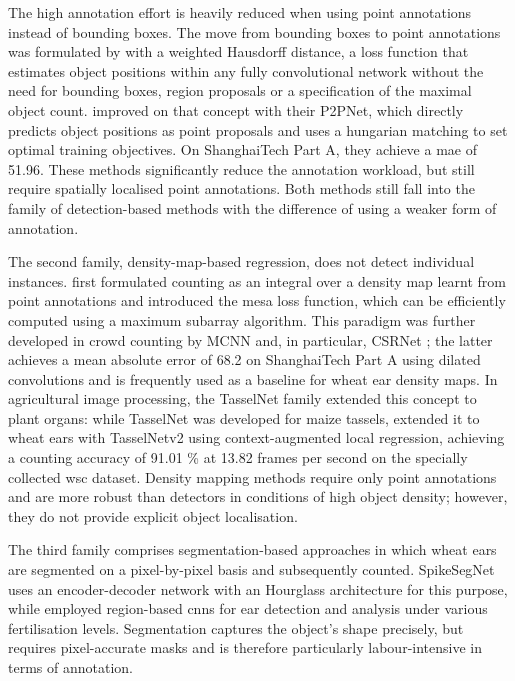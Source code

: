 \documentclass[12pt,parskip = half, DIV=classic,listof=totoc]{scrartcl}
\begin{document}
			The high annotation effort is heavily reduced when using point annotations instead of bounding boxes. The move from bounding boxes to point annotations was formulated by 
			\cite{riberaLocatingObjectsBounding2019} with a weighted Hausdorff distance, a loss function that
			estimates object positions within any fully convolutional network without the need for bounding boxes, region proposals or a specification of the maximal object count.
			\textcite{songRethinkingCountingLocalization2021} improved on that concept with their P2PNet, which directly predicts object positions as point proposals and uses a hungarian matching 
			to set optimal training objectives. On ShanghaiTech Part A, they achieve a \ac{mae} of 51.96. These methods significantly reduce the annotation workload, 
			but still require spatially localised point annotations. Both methods still fall into the family of detection-based methods with the
			difference of using a weaker form of annotation.

			The second family, density-map-based regression, does not detect individual instances. \textcite{lempitskyLearningCountObjects2010} first formulated counting as an integral over a density 
			map learnt from point annotations and introduced the \ac{mesa} loss function, which can be efficiently computed using a maximum subarray algorithm. This paradigm was further developed 
			in crowd counting by MCNN \cite{zhangSingleImageCrowdCounting2016} and, in particular, CSRNet \cite{liCSRNetDilatedConvolutional2018}; the latter achieves a mean absolute error of 68.2 on ShanghaiTech Part A using dilated 
			convolutions and is frequently used as a baseline for wheat ear density maps. In agricultural image processing, the TasselNet family extended this concept to plant organs: 
			while TasselNet \cite{luTasselNetCountingMaize2017} was developed for maize tassels, \textcite{xiongTasselNetv2InfieldCounting2019} extended it to wheat ears with TasselNetv2 using context-augmented local regression, 
			achieving a counting accuracy of 91.01 \% at 13.82 frames per second on the specially collected \ac{wsc} dataset. Density mapping methods require only point annotations and 
			are more robust than detectors in conditions of high object density; however, they do not provide explicit object localisation.

			The third family comprises segmentation-based approaches in which wheat ears are segmented on a pixel-by-pixel basis and subsequently counted.
			SpikeSegNet \cite{misraSpikeSegNetaDeepLearning2020} uses an encoder-decoder network with an Hourglass architecture for this purpose, while \textcite{hasanDetectionAnalysisWheat2018} 
			employed region-based \acp{cnn} for ear detection and analysis under various fertilisation levels. Segmentation captures the object's shape precisely, 
			but requires pixel-accurate masks and is therefore particularly labour-intensive in terms of annotation. 
\end{document}
